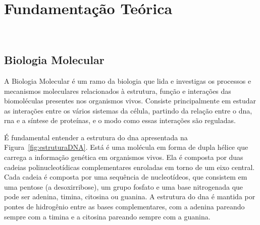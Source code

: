 
\setlength{\parskip}{0.3cm}

\chapter{Fundamentação Teórica}~\label{ch:fundamentacao}

\section{Biologia Molecular}
A Biologia Molecular é um ramo da biologia que lida e investigas os processos e mecanismos moleculares relacionados à estrutura, função e interações das biomoléculas presentes nos organismos vivos. Consiste principalmente em estudar as interações entre os vários sistemas da célula, partindo da relação entre o \gls{dna}, \gls{rna} e a síntese de proteínas, e o modo como essas interações são reguladas.


É fundamental entender a estrutura do \gls{dna} apresentada na Figura~\ref{fig:estruturaDNA}. Está é uma molécula em forma de dupla hélice que carrega a informação genética em organismos vivos. Ela é composta por duas cadeias polinucleotídicas complementares enroladas em torno de um eixo central. Cada cadeia é composta por uma sequência de nucleotídeos, que consistem em uma pentose (a desoxirribose), um grupo fosfato e uma base nitrogenada que pode ser \gls{adenina}, \gls{timina}, \gls{citosina} ou \gls{guanina}. A estrutura do \gls{dna} é mantida por pontes de hidrogênio entre as bases complementares, com a adenina pareando sempre com a timina e a citosina pareando sempre com a guanina.


